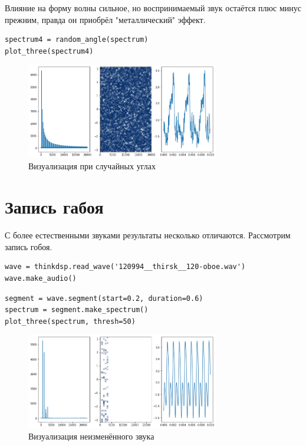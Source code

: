 \documentclass[a4paper,12pt]{report}
\begin{document}
Влияние на форму волны сильное, но воспринимаемый звук остаётся плюс минус прежним, правда он приобрёл "металлический" эффект.

\begin{lstlisting}[caption=Визуализация при случайных углах]
spectrum4 = random_angle(spectrum)
plot_three(spectrum4)
\end{lstlisting}

\begin{figure}[H]
        \centering
        \includegraphics[width=0.75\textwidth]{lab6_fig3_8.png}
        \caption{Визуализация при случайных углах}
        \label{fig:lab6_fig3_8}
\end{figure}

\section{Запись габоя}

С более естественными звуками результаты несколько отличаются. Рассмотрим запись гобоя.

\begin{lstlisting}[caption=Загрузка звука]
wave = thinkdsp.read_wave('120994__thirsk__120-oboe.wav')
wave.make_audio()
\end{lstlisting}

\begin{lstlisting}[caption=Визуализация неизменённого звука]
segment = wave.segment(start=0.2, duration=0.6)
spectrum = segment.make_spectrum()
plot_three(spectrum, thresh=50)
\end{lstlisting}

\begin{figure}[H]
        \centering
        \includegraphics[width=0.75\textwidth]{lab6_fig3_9.png}
        \caption{Визуализация неизменённого звука}
        \label{fig:lab6_fig3_9}
\end{figure}
\end{document}
